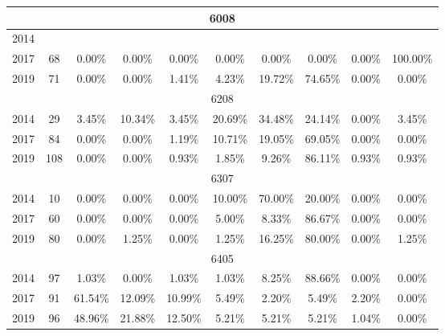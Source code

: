 \begin{table}[H]
\begin{tabular}{|l|c|ccc|ccc|cc|}
\hline
\hline
\multicolumn{10}{|c|}{6008}\\
\hline
2014 & & & & & & & & & \\
2017 & 68 & 0.00\% & 0.00\% & 0.00\% & 0.00\% & 0.00\% & 0.00\% & 0.00\% & 100.00\%\\
2019 & 71 & 0.00\% & 0.00\% & 1.41\% & 4.23\% & 19.72\% & 74.65\% & 0.00\% & 0.00\%\\
\hline
\hline
\multicolumn{10}{|c|}{6208}\\
\hline
2014 & 29 & 3.45\% & 10.34\% & 3.45\% & 20.69\% & 34.48\% & 24.14\% & 0.00\% & 3.45\%\\
2017 & 84 & 0.00\% & 0.00\% & 1.19\% & 10.71\% & 19.05\% & 69.05\% & 0.00\% & 0.00\%\\
2019 & 108 & 0.00\% & 0.00\% & 0.93\% & 1.85\% & 9.26\% & 86.11\% & 0.93\% & 0.93\%\\
\hline
\hline
\multicolumn{10}{|c|}{6307}\\
\hline
2014 & 10 & 0.00\% & 0.00\% & 0.00\% & 10.00\% & 70.00\% & 20.00\% & 0.00\% & 0.00\%\\
2017 & 60 & 0.00\% & 0.00\% & 0.00\% & 5.00\% & 8.33\% & 86.67\% & 0.00\% & 0.00\%\\
2019 & 80 & 0.00\% & 1.25\% & 0.00\% & 1.25\% & 16.25\% & 80.00\% & 0.00\% & 1.25\%\\
\hline
\hline
\multicolumn{10}{|c|}{6405}\\
\hline
2014 & 97 & 1.03\% & 0.00\% & 1.03\% & 1.03\% & 8.25\% & 88.66\% & 0.00\% & 0.00\%\\
2017 & 91 & 61.54\% & 12.09\% & 10.99\% & 5.49\% & 2.20\% & 5.49\% & 2.20\% & 0.00\%\\
2019 & 96 & 48.96\% & 21.88\% & 12.50\% & 5.21\% & 5.21\% & 5.21\% & 1.04\% & 0.00\%\\
\hline
\bottomrule
\end{tabular}
\end{table}
